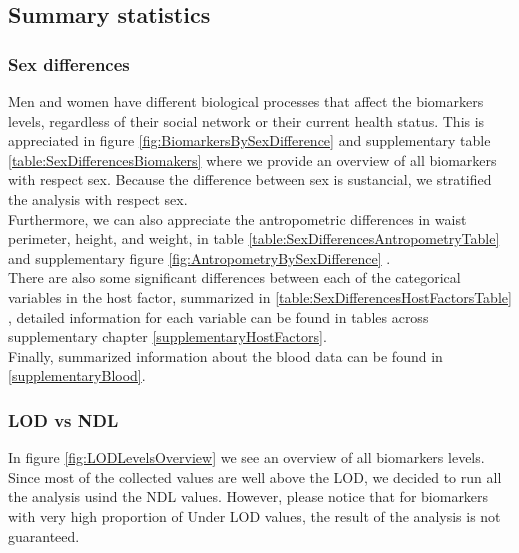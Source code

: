 \documentclass[10pt, a4paper, onecolumn]{article} %
\begin{document}
\subsection{Summary statistics}

\subsubsection{Sex differences}

Men and women have different biological processes that affect the biomarkers levels, regardless of their social network or their current health status. This is appreciated in figure \ref{fig:BiomarkersBySexDifference} and supplementary table \ref{table:SexDifferencesBiomakers} where we provide an overview of all biomarkers with respect sex. Because the difference between sex is sustancial, we stratified the analysis with respect sex.\\

	

Furthermore, we can also appreciate the antropometric differences in waist perimeter, height, and weight, in table \ref{table:SexDifferencesAntropometryTable} and supplementary figure \ref{fig:AntropometryBySexDifference} .\\

	

There are also some significant differences between each of the categorical variables in the host factor, summarized in \ref{table:SexDifferencesHostFactorsTable} , detailed information for each variable can be found in tables across supplementary chapter \ref{supplementaryHostFactors}. \\

	

Finally, summarized information about the blood data can be found in \ref{supplementaryBlood}.\\

\subsubsection{LOD vs NDL}

In figure \ref{fig:LODLevelsOverview} we see an overview of all biomarkers levels. Since most of the collected values are well above the LOD, we decided to run all the analysis usind the NDL values. However, please notice that for biomarkers with very high proportion of Under LOD values, the result of the analysis is not guaranteed.\\
\end{document}
